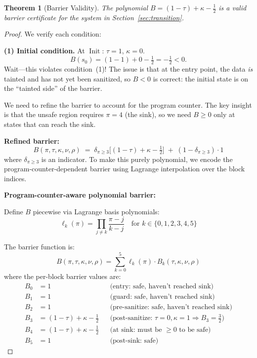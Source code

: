 \documentclass[11pt,a4paper]{article}
\theoremstyle{plain}
\newtheorem{theorem}{Theorem}[section]
\theoremstyle{definition}
\theoremstyle{remark}
\newcommand{\Init}{\operatorname{Init}}
\begin{document}
\begin{theorem}[Barrier Validity]
\label{thm:barrier-valid}
The polynomial $B = (1-\tau) + \kappa - \tfrac{1}{2}$ is a valid
barrier certificate for the system in Section~\ref{sec:transition}.
\end{theorem}

\begin{proof}
We verify each condition:

\medskip
\noindent\textbf{(1) Initial condition.}
At $\Init$: $\tau=1$, $\kappa=0$.
\[
  B(s_0) = (1-1) + 0 - \tfrac{1}{2} = -\tfrac{1}{2} < 0.
\]
Wait---this violates condition~(1)!  The issue is that at the entry
point, the data \emph{is} tainted and has not yet been sanitized, so
$B < 0$ is correct: the initial state is on the ``tainted side'' of the
barrier.

\medskip
We need to refine the barrier to account for the program counter.  The
key insight is that the unsafe region requires $\pi = 4$ (the sink), so
we need $B \geq 0$ only at states that can reach the sink.

\medskip
\noindent\textbf{Refined barrier:}
\begin{equation}
  \boxed{B(\pi, \tau, \kappa, \nu, \rho)
    \;=\; \delta_{\pi \geq 3}\bigl[(1-\tau) + \kappa - \tfrac{1}{2}\bigr]
    \;+\; (1 - \delta_{\pi \geq 3}) \cdot 1}
  \label{eq:barrier-refined}
\end{equation}
where $\delta_{\pi \geq 3}$ is an indicator.  To make this purely
polynomial, we encode the program-counter-dependent barrier using
Lagrange interpolation over the block indices.

\medskip
\noindent\textbf{Program-counter-aware polynomial barrier:}

Define $B$ piecewise via Lagrange basis polynomials:
\begin{equation}
  \ell_k(\pi) = \prod_{j \neq k} \frac{\pi - j}{k - j}
  \quad\text{for } k \in \{0,1,2,3,4,5\}
\end{equation}

The barrier function is:
\begin{equation}
  B(\pi,\tau,\kappa,\nu,\rho)
  = \sum_{k=0}^{5} \ell_k(\pi) \cdot B_k(\tau,\kappa,\nu,\rho)
\label{eq:barrier-lagrange}
\end{equation}
where the per-block barrier values are:
\begin{align}
  B_0 &= 1 & &\text{(entry: safe, haven't reached sink)} \\
  B_1 &= 1 & &\text{(guard: safe, haven't reached sink)} \\
  B_2 &= 1 & &\text{(pre-sanitize: safe, haven't reached sink)} \\
  B_3 &= (1-\tau) + \kappa - \tfrac{1}{2}
    & &\text{(post-sanitize: $\tau=0, \kappa=1 \Rightarrow B_3 = \tfrac{3}{2}$)} \\
  B_4 &= (1-\tau) + \kappa - \tfrac{1}{2}
    & &\text{(at sink: must be $\geq 0$ to be safe)} \\
  B_5 &= 1 & &\text{(post-sink: safe)}
\end{align}


\end{proof}
\end{document}
